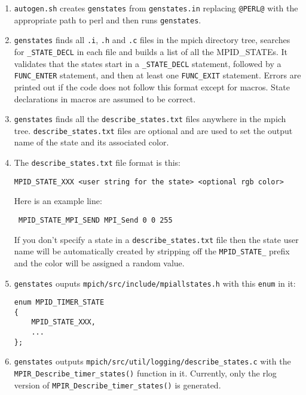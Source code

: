 \documentclass[dvipdfm,11pt]{article}
\begin{document}
\begin{enumerate}
\item \texttt{autogen.sh} creates \texttt{genstates} from 
\texttt{genstates.in} replacing \texttt{@PERL@} with the appropriate path to
perl and then runs \texttt{genstates}.

\item \texttt{genstates} finds all \texttt{.i}, \texttt{.h} and \texttt{.c} files 
in the mpich directory tree, searches for \texttt{\_STATE\_DECL} in each 
file and builds a list of all the MPID\_STATEs.  It validates that the states
start in a \texttt{\_STATE\_DECL} statement, followed by a \texttt{FUNC\_ENTER}
statement, and then at least one \texttt{FUNC\_EXIT} statement.  Errors are printed
out if the code does not follow this format except for macros.  State declarations
in macros are assumed to be correct.

\item \texttt{genstates} finds all the \texttt{describe\_states.txt} 
files anywhere in the mpich tree.  \texttt{describe\_states.txt} files are 
optional and are used to set the output name of the state and its associated 
color.

\item The \texttt{describe\_states.txt} file format is this:
\begin{verbatim}
MPID_STATE_XXX <user string for the state> <optional rgb color>
\end{verbatim}
 Here is an example line:
\begin{verbatim}
 MPID_STATE_MPI_SEND MPI_Send 0 0 255
\end{verbatim}
If you don't specify a state in a \texttt{describe\_states.txt} file then
the state user name will be automatically created by stripping off the 
\texttt{MPID\_STATE\_} prefix and the color will be assigned a random value.

\item \texttt{genstates} ouputs \texttt{mpich/src/include/mpiallstates.h} 
with this \texttt{enum} in it:
\begin{verbatim}
enum MPID_TIMER_STATE
{
    MPID_STATE_XXX,
    ...
};
\end{verbatim}

\item \texttt{genstates} outputs 
\texttt{mpich/src/util/logging/describe\_states.c} with the
\texttt{MPIR\_Describe\_timer\_states()} function in it.  Currently, only 
the rlog version of \texttt{MPIR\_Describe\_timer\_states()} is generated.

\end{enumerate}
\end{document}
